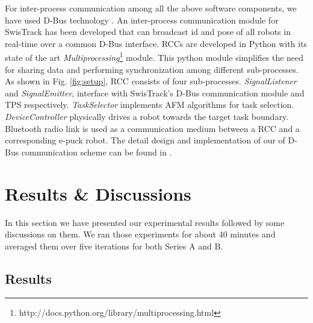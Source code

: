 \documentclass[smallcondensed]{svjour3}
\begin{document}
For inter-process communication among all the above software components, we have used D-Bus technology \citep{Pennington+2010}. An inter-process communication module for SwisTrack has been developed that can broadcast id and pose of all robots in real-time over a common D-Bus interface. RCCs are developed in Python with its state of the art \textit{Multiprocessing}\footnote{http://docs.python.org/library/multiprocessing.html} module. This python module simplifies the need for  sharing data and performing synchronization among different sub-processes. As shown in Fig. \ref{fig:setup}, RCC consists of four sub-processes. {\em SignalListener} and {\em SignalEmitter}, interface with SwisTrack's D-Bus communication module and TPS respectively. {\em TaskSelector} implements AFM algorithms for task selection. {\em DeviceController} physically drives a robot towards the target task boundary. Bluetooth radio link is used as a communication medium between a RCC and a corresponding e-puck robot. The detail design and implementation of our of D-Bus communication scheme can be found in \citep{Sarker2010control}. 
\section{Results \& Discussions}
\label{sec:res}
In this section we have presented our experimental results followed by some discussions on them. We ran those experiments for about 40 minutes and averaged them over five iterations for both Series A and B.
\subsection{Results}
\end{document}

